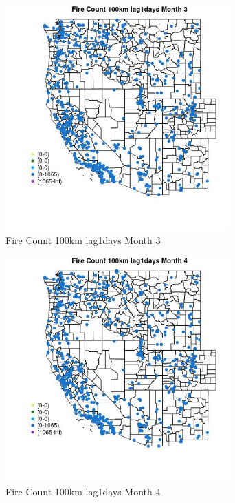 \begin{figure} 
\centering  
\includegraphics[width=0.77\textwidth]{Code_Outputs/Report_ML_input_PM25_Step4_part_f_de_duplicated_aves_prioritize_24hr_obswNAs_MapObsMo3Fire_Count_100km_lag1days.jpg} 
\caption{\label{fig:Report_ML_input_PM25_Step4_part_f_de_duplicated_aves_prioritize_24hr_obswNAsMapObsMo3Fire_Count_100km_lag1days}Fire Count 100km lag1days Month 3} 
\end{figure} 
 

\begin{figure} 
\centering  
\includegraphics[width=0.77\textwidth]{Code_Outputs/Report_ML_input_PM25_Step4_part_f_de_duplicated_aves_prioritize_24hr_obswNAs_MapObsMo4Fire_Count_100km_lag1days.jpg} 
\caption{\label{fig:Report_ML_input_PM25_Step4_part_f_de_duplicated_aves_prioritize_24hr_obswNAsMapObsMo4Fire_Count_100km_lag1days}Fire Count 100km lag1days Month 4} 
\end{figure} 
 

